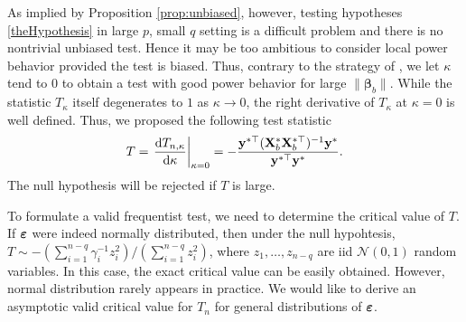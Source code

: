 \documentclass[11pt]{article}
\newcommand{\By}{\mathbf{y}}    \newcommand{\Bz}{\mathbf{z}}
\newcommand{\bfsym}[1]{\ensuremath{\boldsymbol{#1}}}
\def\bbeta{\bfsym \beta}
\theoremstyle{plain}
\theoremstyle{definition}
\theoremstyle{remark}
\begin{document}
As implied by Proposition \ref{prop:unbiased}, however, testing hypotheses \eqref{theHypothesis} in large $p$, small $q$ setting is a difficult problem and there is no nontrivial unbiased test.
Hence it may be too ambitious to consider local power behavior provided the test is biased.
Thus, contrary to the strategy of \cite{Goeman2006}, we let $\kappa$ tend to $0$ to obtain a test with good power behavior for large $\|\bbeta_b\|$.
While the statistic $ T_{\kappa}$ itself degenerates to $1$ as $\kappa\to 0$,
the right derivative of $T_{\kappa}$ at $\kappa=0$ is well defined.
Thus, we proposed the following test statistic
\begin{equation*}
    T=
    \left.\frac{\mathrm d T_{n,\kappa}}{\mathrm d \kappa}\right|_{\kappa=0}
    =
    -
     \frac{\By^{*\top} ( \BX_b^* \BX_b^{*\top} )^{-1} \By^* }{\By^{*\top} \By^*} .
\end{equation*}
The null hypothesis will be rejected if $T$ is large.




To formulate a valid frequentist test, we need to determine the critical value of $T$.
If $\bepsilon$ were indeed normally distributed, then under the null hypohtesis,
    $T \sim
    -
    {(\sum_{i=1}^{n-q} \gamma_i^{-1} z_i^2)}/{(\sum_{i=1}^{n-q} z_i^2)}$,
where $z_1,\ldots, z_{n-q}$ are iid $\mathcal N(0,1)$ random variables.
In this case, the exact critical value can be easily obtained.
However, normal distribution rarely appears in practice.
We would like to derive an asymptotic valid critical value for $T_{n}$ for general distributions of $\bepsilon$.
\end{document}
